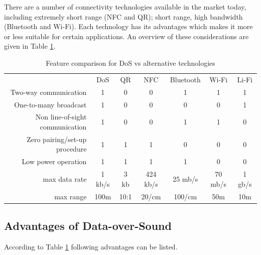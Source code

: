 \documentclass{article}
\begin{document}
There are a number of connectivity technologies available in the market today,
including extremely short range (NFC and QR); short range, high bandwidth
(Bluetooth and Wi-Fi). Each technology has its advantages which makes it more
or less suitable for certain applications. An overview of these considerations
are given in Table \ref{table:feature_dos}.

\begin{table}[!h]
\begin{center}
\begin{tabular}{r|c|c|c|c|c|c|}
\multicolumn{1}{r}{}
 &  \multicolumn{1}{c}{DoS}
 &  \multicolumn{1}{c}{QR}
 &  \multicolumn{1}{c}{NFC}
 &  \multicolumn{1}{c}{Bluetooth}
 &  \multicolumn{1}{c}{Wi-Fi}
 &  \multicolumn{1}{c}{Li-Fi} \\
\cline{2-7}
    Two-way communication & 1 & 0 & 0 & 1 & 1 & 1 \\
\cline{2-7}
    One-to-many broadcast & 1 & 0 & 0 & 0 & 0 & 1 \\ 
\cline{2-7}
    Non line-of-sight communication & 1 & 0 & 0 & 1 & 1 & 0 \\
\cline{2-7}
    Zero pairing/set-up procedure & 1 & 1 & 1 & 0 & 0 & 0 \\
\cline{2-7}
    Low power operation & 1 & 1 & 1 & 1 & 0 & 0 \\
\cline{2-7}
    max data rate & 1 kb/s & 3 kb & 424 kb/s & 25 mb/s & 70 mb/s & 1 gb/s \\
\cline{2-7}
    max range & 100m & 10:1 & 20/cm & 100/cm & 50m & 10m \\
\cline{2-7}
\end{tabular}
\end{center}
\caption{Feature comparison for DoS vs alternative technologies}
\label{table:feature_dos}
\end{table}

\subsection{Advantages of Data-over-Sound}

According to Table \ref{table:feature_dos} following advantages can be listed.
\end{document}
